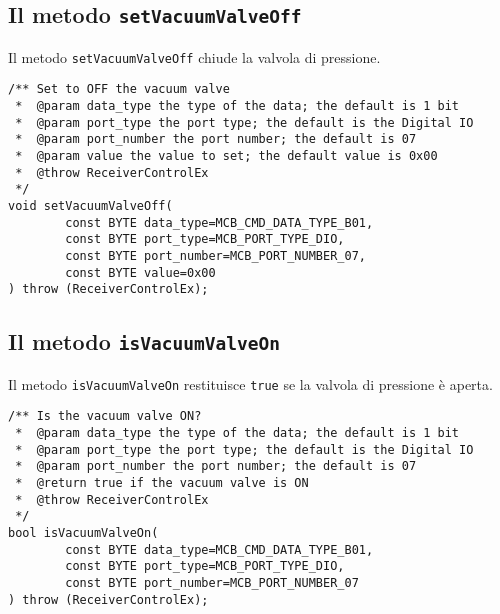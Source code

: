 \subsection{Il metodo \texttt{setVacuumValveOff}}
Il metodo \texttt{setVacuumValveOff} chiude la valvola di pressione.
\lstset{language=C++}
\begin{lstlisting}[caption={Dichiarazione del metodo \texttt{setVacuumValveOff}},
label=lst:setVacuumValveOff,mathescape]
/** Set to OFF the vacuum valve
 *  @param data_type the type of the data; the default is 1 bit
 *  @param port_type the port type; the default is the Digital IO
 *  @param port_number the port number; the default is 07
 *  @param value the value to set; the default value is 0x00
 *  @throw ReceiverControlEx
 */
void setVacuumValveOff(
        const BYTE data_type=MCB_CMD_DATA_TYPE_B01,
        const BYTE port_type=MCB_PORT_TYPE_DIO,
        const BYTE port_number=MCB_PORT_NUMBER_07,
        const BYTE value=0x00
) throw (ReceiverControlEx);
\end{lstlisting}
\lstset{numbers=none}


\subsection{Il metodo \texttt{isVacuumValveOn}}
Il metodo \texttt{isVacuumValveOn} restituisce \texttt{true} se la 
valvola di pressione \`e aperta.
\lstset{language=C++}
\begin{lstlisting}[caption={Dichiarazione del metodo \texttt{isVacuumValveOn}},
label=lst:isVacuumValveOn,mathescape]
/** Is the vacuum valve ON?
 *  @param data_type the type of the data; the default is 1 bit
 *  @param port_type the port type; the default is the Digital IO
 *  @param port_number the port number; the default is 07
 *  @return true if the vacuum valve is ON
 *  @throw ReceiverControlEx
 */
bool isVacuumValveOn(
        const BYTE data_type=MCB_CMD_DATA_TYPE_B01,
        const BYTE port_type=MCB_PORT_TYPE_DIO,
        const BYTE port_number=MCB_PORT_NUMBER_07
) throw (ReceiverControlEx);
\end{lstlisting}
\lstset{numbers=none}


